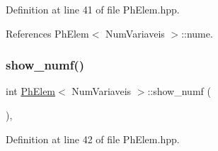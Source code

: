 Definition at line 41 of file Ph\+Elem.\+hpp.



References Ph\+Elem$<$ Num\+Variaveis $>$\+::nume.

\mbox{\label{classPhElem_afbe63a88e47733c8daec89a4c72b7da0}} 
\subsubsection{\texorpdfstring{show\+\_\+numf()}{show\_numf()}}
{\footnotesize\ttfamily int \hyperlink{classPhElem}{Ph\+Elem}$<$ Num\+Variaveis $>$\+::show\+\_\+numf (\begin{DoxyParamCaption}{ }\end{DoxyParamCaption})\hspace{0.3cm}{\ttfamily [inline]}, {\ttfamily [inherited]}}



Definition at line 42 of file Ph\+Elem.\+hpp.



